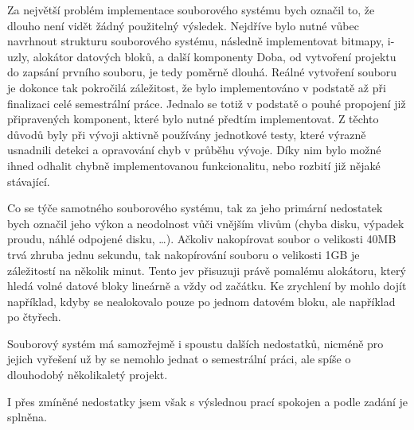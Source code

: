 \documentclass[12pt, a4paper]{article}
\begin{document}
    Za největší problém implementace souborového systému bych označil to, že dlouho není vidět žádný použitelný výsledek.
    Nejdříve bylo nutné vůbec navrhnout strukturu souborového systému, následně implementovat bitmapy, i-uzly, alokátor datových bloků, a další komponenty
    Doba, od vytvoření projektu do zapsání prvního souboru, je tedy poměrně dlouhá.
    Reálné vytvoření souboru je dokonce tak pokročilá záležitost, že bylo implementováno v podstatě až při finalizaci celé semestrální práce.
    Jednalo se totiž v podstatě o pouhé propojení již připravených komponent, které bylo nutné předtím implementovat.
    Z těchto důvodů byly při vývoji aktivně používány jednotkové testy, které výrazně usnadnili detekci a opravování chyb v průběhu vývoje.
    Díky nim bylo možné ihned odhalit chybně implementovanou funkcionalitu, nebo rozbití již nějaké stávající.

    Co se týče samotného souborového systému, tak za jeho primární nedostatek bych označil jeho výkon a neodolnost vůči vnějším vlivům (chyba disku, výpadek proudu, náhlé odpojené disku, \dots).
    Ačkoliv nakopírovat soubor o velikosti 40MB trvá zhruba jednu sekundu, tak nakopírování souboru o velikosti 1GB je záležitostí na několik minut.
    Tento jev přisuzuji právě pomalému alokátoru, který hledá volné datové bloky lineárně a vždy od začátku.
    Ke zrychlení by mohlo dojít například, kdyby se nealokovalo pouze po jednom datovém bloku, ale například po čtyřech.

    Souborový systém má samozřejmě i spoustu dalších nedostatků, nicméně pro jejich vyřešení už by se nemohlo jednat o semestrální práci, ale spíše o dlouhodobý několikaletý projekt.

    I přes zmíněné nedostatky jsem však s výslednou prací spokojen a podle zadání je splněna.

    \newpage
    \listoffigures
    
\end{document}
